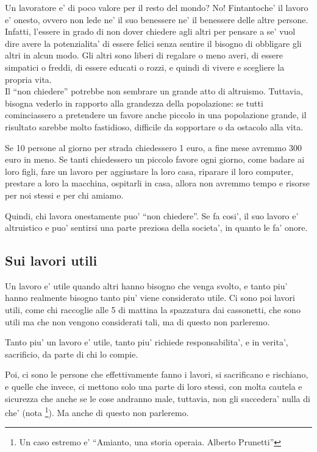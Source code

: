 Un lavoratore e' di poco valore per il resto del mondo?
No! Fintantoche' il lavoro e' onesto, ovvero non lede ne' il suo benessere ne' il benessere delle altre persone.\\
Infatti, l'essere in grado di non dover chiedere agli altri per pensare a se' vuol dire avere la potenzialita' di essere felici senza sentire il bisogno di obbligare gli altri in alcun modo. Gli altri sono liberi di regalare o meno averi, di essere simpatici o freddi, di essere educati o rozzi, e quindi di vivere e scegliere la propria vita.\\
Il ``non chiedere'' potrebbe non sembrare un grande atto di altruismo. Tuttavia, bisogna vederlo in rapporto alla grandezza della popolazione: se tutti cominciassero a pretendere un favore anche piccolo in una popolazione grande, il risultato sarebbe molto fastidioso, difficile da sopportare o da ostacolo alla vita.

Se 10 persone al giorno per strada chiedessero 1 euro, a fine mese avremmo 300 euro in meno. Se tanti chiedessero un piccolo favore ogni giorno, come badare ai loro figli, fare un lavoro per aggiustare la loro casa, riparare il loro computer, prestare a loro la macchina, ospitarli in casa, allora non avremmo tempo e risorse per noi stessi e per chi amiamo.

Quindi, chi lavora onestamente puo' ``non chiedere''. Se fa cosi', il suo lavoro e' altruistico e puo' sentirsi una parte preziosa della societa', in quanto le fa' onore.

\subsection{Sui lavori utili}
Un lavoro e' utile quando altri hanno bisogno che venga svolto, e tanto piu' hanno realmente bisogno tanto piu' viene considerato utile. Ci sono poi lavori utili, come chi raccoglie alle 5 di mattina la spazzatura dai cassonetti, che sono utili ma che non vengono considerati tali, ma di questo non parleremo. 

Tanto piu' un lavoro e' utile, tanto piu' richiede responsabilita', e in verita', sacrificio, da parte di chi lo compie.

Poi, ci sono le persone che effettivamente fanno i lavori, si sacrificano e rischiano, e quelle che invece, ci mettono solo una parte di loro stessi, con molta cautela e sicurezza che anche se le cose andranno male, tuttavia, non gli succedera' nulla di che' (nota \footnote{Un caso estremo e' ``Amianto, una storia operaia. Alberto Prunetti''}). Ma anche di questo non parleremo.

